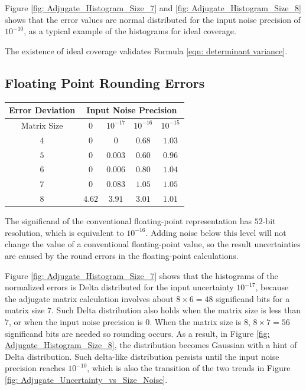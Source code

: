 \documentclass[twoside]{article}
\numberwithin{equation}{section}
\begin{document}
Figure \ref{fig: Adjugate_Histogram_Size_7} and \ref{fig: Adjugate_Histogram_Size_8} shows that the error values are normal distributed for the input noise precision of  $10^{-10}$, as a typical example of the histograms for ideal coverage.

The existence of ideal coverage validates Formula \eqref{eqn: determinant variance}.


\subsection{Floating Point Rounding Errors}

\begin{table}
\centering
\begin{tabular}{|c|c|c|c|c|} 
\hline 
Error Deviation & \multicolumn{4}{|c|}{Input Noise Precision}  \\ 
\hline 
Matrix Size & $0$ & $10^{-17}$ & $10^{-16}$ & $10^{-15}$ \\ 
\hline 
$4$ & $0$     &       $0$ & $0.68$ & $1.03$ \\
\hline 
$5$ & $0$     & $0.003$ & $0.60$ & $0.96$ \\
\hline 
$6$ & $0$     & $0.006$ & $0.80$ & $1.04$ \\
\hline 
$7$ & $0$     & $0.083$ & $1.05$ & $1.05$ \\
\hline 
$8$ & $4.62$ & $3.91$  & $3.01$ & $1.01$ \\
\hline 
\end{tabular}
\label{tbl: matrix rounding errors}
\end{table}


The significand of the conventional floating-point representation \cite{Floating_Point_Standard} has $52$-bit resolution, which is equivalent to $10^{-16}$.
Adding noise below this level will not change the value of a conventional floating-point value, so the result uncertainties are caused by the round errors in the floating-point calculations.

Figure \ref{fig: Adjugate_Histogram_Size_7} shows that the histograms of the normalized errors is Delta distributed for the input uncertainty $10^{-17}$, because the adjugate matrix calculation involves about $8 \times 6 = 48$ significand bits for a matrix size $7$.
Such Delta distribution also holds when the matrix size is less than $7$, or when the input noise precision is $0$.
When the matrix size is $8$, $8 \times 7 = 56$ significand bits are needed so rounding occurs.
As a result, in Figure \ref{fig: Adjugate_Histogram_Size_8}, the distribution becomes Gaussian with a hint of Delta distribution.
Such delta-like distribution persists until the input noise precision reaches $10^{-10}$, which is also the transition of the two trends in Figure \ref{fig: Adjugate_Uncertainty_vs_Size_Noise}.
\end{document}
